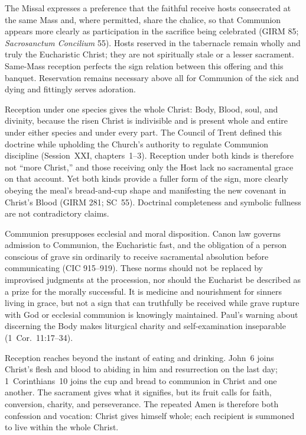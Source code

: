 The Missal expresses a preference that the faithful receive hosts consecrated at the same Mass and, where permitted, share the chalice, so that Communion appears more clearly as participation in the sacrifice being celebrated (GIRM 85; \emph{Sacrosanctum Concilium} 55). Hosts reserved in the tabernacle remain wholly and truly the Eucharistic Christ; they are not spiritually stale or a lesser sacrament. Same-Mass reception perfects the sign relation between this offering and this banquet. Reservation remains necessary above all for Communion of the sick and dying and fittingly serves adoration.

Reception under one species gives the whole Christ: Body, Blood, soul, and divinity, because the risen Christ is indivisible and is present whole and entire under either species and under every part. The Council of Trent defined this doctrine while upholding the Church's authority to regulate Communion discipline (Session~XXI, chapters~1--3). Reception under both kinds is therefore not ``more Christ,'' and those receiving only the Host lack no sacramental grace on that account. Yet both kinds provide a fuller form of the sign, more clearly obeying the meal's bread-and-cup shape and manifesting the new covenant in Christ's Blood (GIRM 281; SC~55). Doctrinal completeness and symbolic fullness are not contradictory claims.

Communion presupposes ecclesial and moral disposition. Canon law governs admission to Communion, the Eucharistic fast, and the obligation of a person conscious of grave sin ordinarily to receive sacramental absolution before communicating (CIC 915--919). These norms should not be replaced by improvised judgments at the procession, nor should the Eucharist be described as a prize for the morally successful. It is medicine and nourishment for sinners living in grace, but not a sign that can truthfully be received while grave rupture with God or ecclesial communion is knowingly maintained. Paul's warning about discerning the Body makes liturgical charity and self-examination inseparable (1~Cor.~11:17--34).

Reception reaches beyond the instant of eating and drinking. John~6 joins Christ's flesh and blood to abiding in him and resurrection on the last day; 1~Corinthians~10 joins the cup and bread to communion in Christ and one another. The sacrament gives what it signifies, but its fruit calls for faith, conversion, charity, and perseverance. The repeated Amen is therefore both confession and vocation: Christ gives himself whole; each recipient is summoned to live within the whole Christ.

